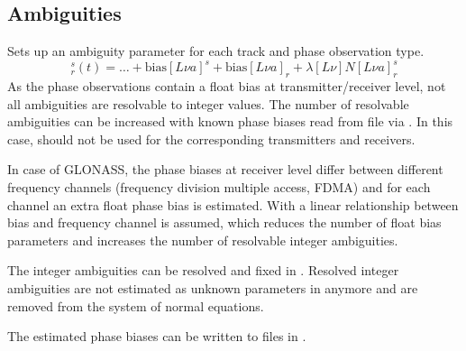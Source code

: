 \subsection{Ambiguities}\label{gnssParametrizationType:ambiguities}
Sets up an ambiguity parameter for each track and phase observation type.
\begin{equation}
  [L\nu a]_r^s(t) = \dots + \text{bias}[L\nu a]^s + \text{bias}[L\nu a]_r + \lambda[L\nu] N[L\nu a]_r^s
\end{equation}
As the phase observations contain a float bias at transmitter/receiver level, not all ambiguities
are resolvable to integer values. The number of resolvable ambiguities can be increased with
known phase biases read from file via .
In this case,  should
not be used for the corresponding transmitters and receivers.

In case of GLONASS, the phase biases at receiver level differ between different frequency channels
(frequency division multiple access, FDMA) and for each channel an extra float phase bias is estimated.
With  a linear relationship between bias and frequency channel is assumed,
which reduces the number of float bias parameters and increases the number of resolvable integer ambiguities.

The integer ambiguities can be resolved and fixed in
.
Resolved integer ambiguities are not estimated as unknown parameters in
 anymore
and are removed from the system of normal equations.

The estimated phase biases can be written to files in
.


